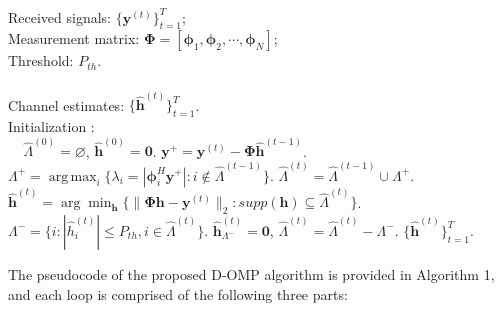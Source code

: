 \documentclass[conference]{IEEEtran}
\DeclareMathOperator*{\argmax}{arg\,max}
\begin{document}
\begin{algorithm}[htb]
\renewcommand{\algorithmicrequire}{\textbf{Input:}}
\renewcommand\algorithmicensure {\textbf{Output:} }
\caption{D-OMP Algorithm}
\label{D-OMP}
\begin{algorithmic}[1]
\REQUIRE ~~\\
Received signals: $\{\mathbf{y}^{(t)}\}_{t=1}^{T}$;\\
Measurement matrix: $\mathbf{\Phi}=[\boldsymbol{\phi}_{1}, \boldsymbol{\phi}_{2}, \cdots, \boldsymbol{\phi}_{N}]$; \\
Threshold: $P_{th}$.\\
\ENSURE ~~\\
Channel estimates: $\{\mathbf{\hat{h}}^{(t)}\}_{t=1}^{T}$. \\
\STATE Initialization : \\
\STATE $\;\;\;\;\hat{\Lambda}^{(0)}=\varnothing$, $\hat{\mathbf{h}}^{(0)}=\mathbf{0}$.
\STATE $\mathbf{y}^{+}=\mathbf{y}^{(t)}-\mathbf{\Phi}\hat{\mathbf{h}}^{(t-1)}$. %
\STATE $\Lambda^{+}=\argmax_{i} \{\lambda_i=|\boldsymbol{\phi}_{i}^H \mathbf{y}^{+}|: i\notin \hat{\Lambda}^{(t-1)}\}$. %
\STATE $\hat{\Lambda}^{(t)}=\hat{\Lambda}^{(t-1)}\cup\Lambda^{+}$.%
\STATE $\hat{\mathbf{h}}^{(t)}=\arg\min_{\mathbf{h}}\{\|\mathbf{\Phi}\mathbf{h}-\mathbf{y}^{(t)}\|_2: supp(\mathbf{h})\subseteq\hat{\Lambda}^{(t)}\}$.  %
\STATE $\Lambda^{-}=\{i:|\hat{h}_i^{(t)}|\leq P_{th}, i\in\hat{\Lambda}^{(t)}\} $. %
\STATE $\hat{\mathbf{h}}_{\Lambda^{-}}^{(t)}=\mathbf{0}$, $\hat{\Lambda}^{(t)}=\hat{\Lambda}^{(t)}-\Lambda^{-}$. %
\ENDFOR
\RETURN $\{\mathbf{\hat{h}}^{(t)}\}_{t=1}^{T}$.
\end{algorithmic}
\end{algorithm}

The pseudocode of the proposed D-OMP algorithm is provided in Algorithm 1, and each loop is comprised of the following three parts:
\end{document}
